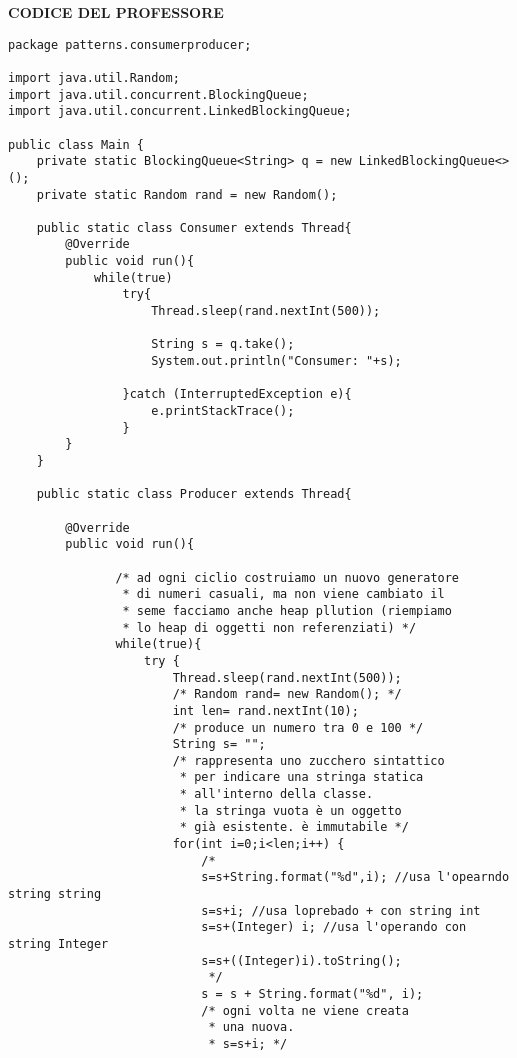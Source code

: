 \noindent \textbf{CODICE DEL PROFESSORE} \newline
\begin{lstlisting}[basicstyle=\small,]
package patterns.consumerproducer;

import java.util.Random;
import java.util.concurrent.BlockingQueue;
import java.util.concurrent.LinkedBlockingQueue;

public class Main {
    private static BlockingQueue<String> q = new LinkedBlockingQueue<>();
    private static Random rand = new Random();

    public static class Consumer extends Thread{
        @Override
        public void run(){
            while(true)
                try{
                    Thread.sleep(rand.nextInt(500));

                    String s = q.take();
                    System.out.println("Consumer: "+s);

                }catch (InterruptedException e){
                    e.printStackTrace();
                }
        }
    }

    public static class Producer extends Thread{

        @Override
        public void run(){

               /* ad ogni ciclio costruiamo un nuovo generatore
                * di numeri casuali, ma non viene cambiato il 
                * seme facciamo anche heap pllution (riempiamo
                * lo heap di oggetti non referenziati) */
               while(true){
                   try {
                       Thread.sleep(rand.nextInt(500));
                       /* Random rand= new Random(); */
                       int len= rand.nextInt(10); 
                       /* produce un numero tra 0 e 100 */
                       String s= ""; 
                       /* rappresenta uno zucchero sintattico
                        * per indicare una stringa statica
                        * all'interno della classe.
                        * la stringa vuota è un oggetto
                        * già esistente. è immutabile */
                       for(int i=0;i<len;i++) {
                           /*
                           s=s+String.format("%d",i); //usa l'opearndo string string
                           s=s+i; //usa loprebado + con string int
                           s=s+(Integer) i; //usa l'operando con string Integer
                           s=s+((Integer)i).toString();
                            */
                           s = s + String.format("%d", i);
                           /* ogni volta ne viene creata
                            * una nuova.
                            * s=s+i; */


\end{lstlisting}
